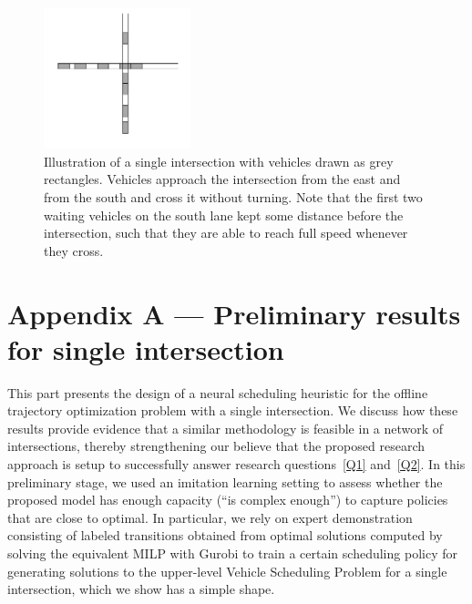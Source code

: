 \documentclass{article}
\theoremstyle{definition}
\theoremstyle{plain}
\begin{document}
\newpage



\newpage
{}

\appendix

\begin{figure}
  \centering
  \includegraphics[width=0.38\textwidth]{../figures/single_intersection_example.png}
  \caption{Illustration of a single intersection with vehicles drawn as grey
    rectangles. Vehicles approach the intersection from the east and from the
    south and cross it without turning. Note that the first two waiting vehicles
    on the south lane kept some distance before the intersection, such that they
    are able to reach full speed whenever they
    cross.}\label{fig:single_intersection}
\end{figure}

\section*{Appendix A --- Preliminary results for single intersection}

\renewcommand{\thesection}{A}

This part presents the design of a neural scheduling heuristic for the offline
trajectory optimization problem with a single intersection. We discuss how these
results provide evidence that a similar methodology is feasible in a network of
intersections, thereby strengthening our believe that the proposed research
approach is setup to successfully answer research questions~\ref{Q1}
and~\ref{Q2}.
%
In this preliminary stage, we used an imitation learning setting to assess
whether the proposed model has enough capacity (``is complex enough'') to
capture policies that are close to optimal. In particular, we rely on expert
demonstration consisting of labeled transitions obtained from optimal solutions
computed by solving the equivalent MILP with Gurobi to train a certain
scheduling policy for generating solutions to the upper-level Vehicle Scheduling
Problem for a single intersection, which we show has a simple shape.
\end{document}
